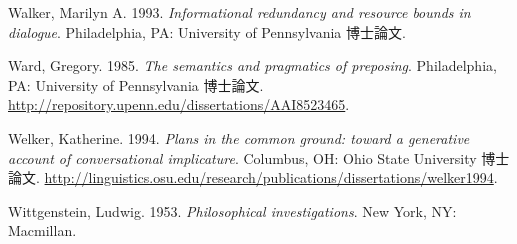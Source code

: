 \documentclass{goken}
\begin{document}
\begin{thebibliography}{74}
Walker, Marilyn A. 1993.
\newblock \emph{Informational redundancy and resource bounds in dialogue}.
\newblock Philadelphia, PA: University of Pennsylvania 博士論文.

Ward, Gregory. 1985.
\newblock \emph{The semantics and pragmatics of preposing}.
\newblock Philadelphia, PA: University of Pennsylvania 博士論文.
\newblock \urlprefix\url{http://repository.upenn.edu/dissertations/AAI8523465}.

Welker, Katherine. 1994.
\newblock \emph{Plans in the common ground: toward a generative account of
  conversational implicature}.
\newblock Columbus, OH: Ohio State University 博士論文.
\newblock
  \urlprefix\url{http://linguistics.osu.edu/research/publications/dissertations/welker1994}.

Wittgenstein, Ludwig. 1953.
\newblock \emph{Philosophical investigations}.
\newblock New York, NY: Macmillan.

\end{thebibliography}
\metainfo
\end{document}
